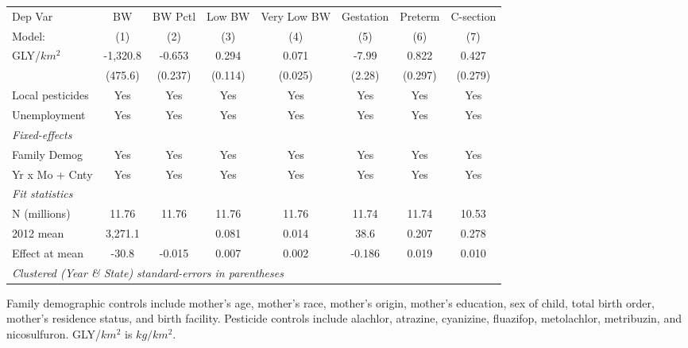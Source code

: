 \begingroup
\centering
\begin{tabular}{lccccccc}
   \toprule
   Dep Var          & BW       & BW Pctl & Low BW  & Very Low BW & Gestation & Preterm & C-section\\  
   Model:           & (1)      & (2)     & (3)     & (4)         & (5)       & (6)     & (7)\\  
   \midrule 
   GLY/$km^2$       & -1,320.8 & -0.653  & 0.294   & 0.071       & -7.99     & 0.822   & 0.427\\   
                    & (475.6)  & (0.237) & (0.114) & (0.025)     & (2.28)    & (0.297) & (0.279)\\   
   Local pesticides & Yes      & Yes     & Yes     & Yes         & Yes       & Yes     & Yes\\  
   Unemployment     & Yes      & Yes     & Yes     & Yes         & Yes       & Yes     & Yes\\  
   \midrule
   \emph{Fixed-effects}\\
   Family Demog     & Yes      & Yes     & Yes     & Yes         & Yes       & Yes     & Yes\\  
   Yr x Mo + Cnty   & Yes      & Yes     & Yes     & Yes         & Yes       & Yes     & Yes\\  
   \midrule
   \emph{Fit statistics}\\
   N (millions)     & 11.76    & 11.76   & 11.76   & 11.76       & 11.74     & 11.74   & 10.53\\  
   2012 mean        & 3,271.1  &         & 0.081   & 0.014       & 38.6      & 0.207   & 0.278\\  
   Effect at mean   & -30.8    & -0.015  & 0.007   & 0.002       & -0.186    & 0.019   & 0.010\\  
   \midrule
   \multicolumn{8}{l}{\emph{Clustered (Year \& State) standard-errors in parentheses}}\\
\end{tabular}
 
\par \raggedright 
Family demographic controls include mother's age, mother's race, mother's origin, mother's education, sex of child, total birth order, mother's residence status, and birth facility. Pesticide controls include alachlor, atrazine, cyanizine, fluazifop, metolachlor, metribuzin, and nicosulfuron. GLY/$km^2$ is $kg/km^2$.
\par\endgroup

